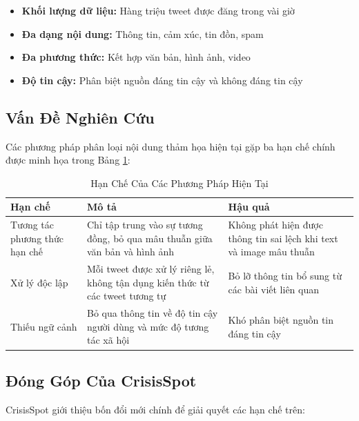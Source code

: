 \documentclass[12pt,a4paper]{article}
\begin{document}
\begin{itemize}
    \item \textbf{Khối lượng dữ liệu:} Hàng triệu tweet được đăng trong vài giờ
    \item \textbf{Đa dạng nội dung:} Thông tin, cảm xúc, tin đồn, spam
    \item \textbf{Đa phương thức:} Kết hợp văn bản, hình ảnh, video
    \item \textbf{Độ tin cậy:} Phân biệt nguồn đáng tin cậy và không đáng tin cậy
\end{itemize}

\subsection{Vấn Đề Nghiên Cứu}

Các phương pháp phân loại nội dung thảm họa hiện tại gặp ba hạn chế chính được minh họa trong Bảng \ref{tab:limitations}:

\begin{table}[H]
\centering
\caption{Hạn Chế Của Các Phương Pháp Hiện Tại}
\label{tab:limitations}
\small
\begin{tabular}{l|p{5cm}|p{5cm}}
\toprule
\textbf{Hạn chế} & \textbf{Mô tả} & \textbf{Hậu quả} \\
\midrule
Tương tác phương thức hạn chế & Chỉ tập trung vào sự tương đồng, bỏ qua mâu thuẫn giữa văn bản và hình ảnh & Không phát hiện được thông tin sai lệch khi text và image mâu thuẫn \\
\midrule
Xử lý độc lập & Mỗi tweet được xử lý riêng lẻ, không tận dụng kiến thức từ các tweet tương tự & Bỏ lỡ thông tin bổ sung từ các bài viết liên quan \\
\midrule
Thiếu ngữ cảnh & Bỏ qua thông tin về độ tin cậy người dùng và mức độ tương tác xã hội & Khó phân biệt nguồn tin đáng tin cậy \\
\bottomrule
\end{tabular}
\end{table}

\subsection{Đóng Góp Của CrisisSpot}

CrisisSpot \cite{shahid2024crisisspot} giới thiệu bốn đổi mới chính để giải quyết các hạn chế trên:
\end{document}
